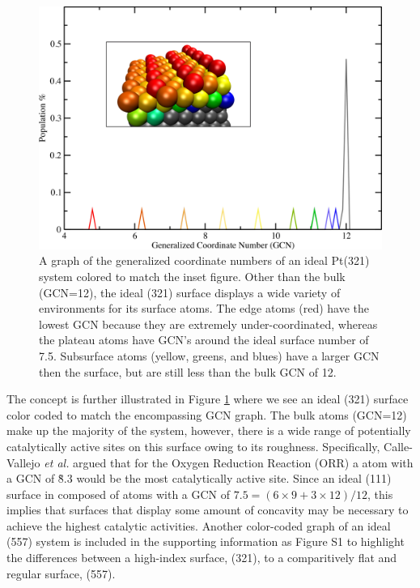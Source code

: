 \begin{figure}
  \includegraphics[width=\linewidth]{../figures/chap4/321_ideal_gcn.pdf}
  \caption{A graph of the generalized coordinate numbers of an ideal Pt(321)
system colored to match the inset figure. Other than the bulk (GCN=12), the
ideal (321) surface displays a wide variety of environments for its surface
atoms.  The edge atoms (red) have the lowest GCN because they are extremely
under-coordinated, whereas the plateau atoms have GCN's around the ideal
surface number of 7.5. Subsurface atoms (yellow, greens, and blues) have a
larger GCN then the surface, but are still less than the bulk GCN of 12.  }
\label{fig:ideal321GCN}
\end{figure}

The concept is further illustrated in Figure \ref{fig:ideal321GCN} where we see
an ideal  (321) surface color coded to match the encompassing GCN graph.
The bulk atoms (GCN=12) make up the majority of the system, however, there is a
wide range of potentially catalytically active sites on this surface owing to
its roughness. Specifically, Calle-Vallejo {\em et al.} argued that for the
Oxygen Reduction Reaction (ORR) a  atom with a GCN of \~8.3 would be the
most catalytically active site. Since an ideal (111) surface in composed of
atoms with a GCN of $7.5=(6\times9 + 3\times12)/12$, this implies that surfaces
that display some amount of concavity may be necessary to achieve the highest
catalytic activities. Another color-coded graph of an ideal  (557)
system is included in the supporting information as Figure S1 to highlight the
differences between a high-index surface, (321), to a comparitively flat and
regular surface, (557).

